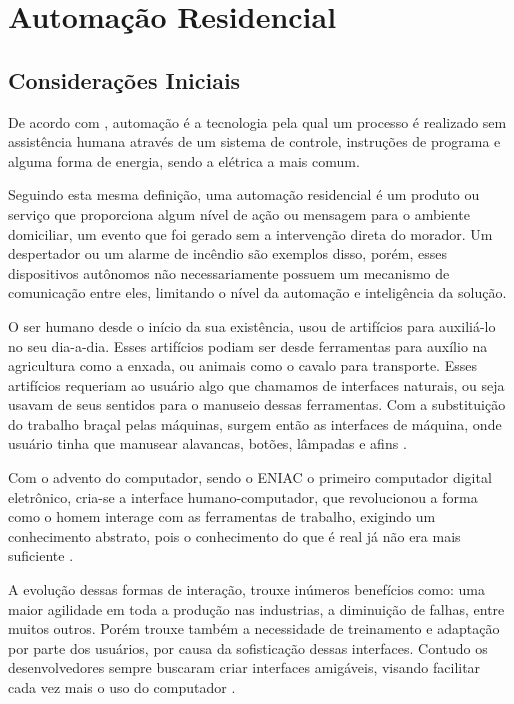 \chapter {Automação Residencial}
\label{cap:1}

\section {Considerações Iniciais}
De acordo com , automação é a tecnologia pela qual um processo é realizado
sem assistência humana através de um sistema de controle, instruções de programa e alguma forma de energia,
sendo a elétrica a mais comum.

Seguindo esta mesma definição, uma automação residencial é um produto ou serviço que proporciona algum nível de
ação ou mensagem para o ambiente domiciliar, um evento que foi gerado sem a intervenção direta do morador. Um
despertador ou um alarme de incêndio são exemplos disso, porém, esses dispositivos autônomos não
necessariamente possuem um mecanismo de comunicação entre eles, limitando o nível da automação e inteligência
da solução. \cite{riley2012}

O ser humano desde o início da sua existência, usou de artifícios para auxiliá-lo no seu dia-a-dia. Esses
artifícios podiam ser desde ferramentas para auxílio na agricultura como a enxada, ou animais como o cavalo
para transporte. Esses artifícios requeriam ao usuário algo que chamamos de interfaces naturais, ou seja
usavam de seus sentidos para o manuseio dessas ferramentas. Com a substituição do trabalho braçal pelas
máquinas, surgem então as interfaces de máquina, onde usuário tinha que manusear alavancas, botões, lâmpadas e
afins \cite{kirner2007}.

Com o advento do computador, sendo o ENIAC o primeiro computador digital eletrônico, cria-se a interface
humano-computador, que revolucionou a forma como o homem interage com as ferramentas de trabalho, exigindo um
conhecimento abstrato, pois o conhecimento do que é real já não era mais suficiente \cite{eniac,kirner2007}.

A evolução dessas formas de interação, trouxe inúmeros benefícios como: uma maior agilidade em toda a produção
nas industrias, a diminuição de falhas, entre muitos outros. Porém trouxe também a necessidade de treinamento
e adaptação por parte dos usuários, por causa da sofisticação dessas interfaces. Contudo os desenvolvedores
sempre buscaram criar interfaces amigáveis, visando facilitar cada vez mais o uso do computador
\cite{kirner2007}.

